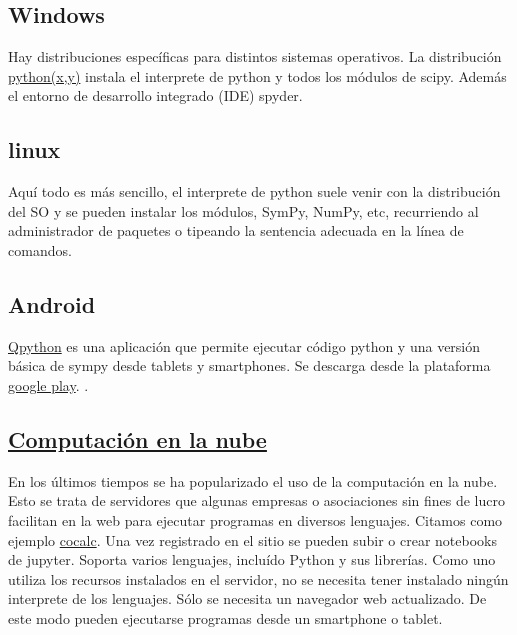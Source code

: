 \subsection{Windows} Hay distribuciones específicas para distintos sistemas operativos. La distribución  \href{https://code.google.com/p/pythonxy/}{python(x,y)}  instala el interprete de python y todos los módulos de scipy. Además el entorno de desarrollo integrado (IDE) spyder.


\subsection{linux} Aquí todo es más sencillo, el interprete de python suele venir con 
la distribución del SO y se pueden instalar los módulos, SymPy, NumPy, etc, 
recurriendo al administrador de paquetes o tipeando la sentencia adecuada en la línea 
de comandos.  

\subsection{Android} \href{http://qpython.com/}{Qpython} es una aplicación que permite ejecutar código python y una versión básica de sympy desde tablets y smartphones. Se descarga desde la plataforma \href{https://play.google.com/store/apps/details?id=com.hipipal.qpyplus}{google play}.
. 

\subsection{\href{https://es.wikipedia.org/wiki/Computación_en_la_nube}{Computación en la nube}}

En los últimos tiempos se ha popularizado el uso de la computación en la nube. Esto se trata de servidores que algunas empresas o asociaciones sin fines de lucro facilitan en la web para ejecutar programas en diversos lenguajes. Citamos como ejemplo \href{http://www.cocalc.com}{cocalc}. Una vez registrado en el sitio se pueden subir o crear notebooks de jupyter. Soporta varios lenguajes, incluído Python y sus librerías.  Como uno utiliza los recursos instalados en el servidor, no se necesita tener instalado ningún interprete de los lenguajes. Sólo se necesita un navegador web actualizado. De este modo pueden ejecutarse programas desde un smartphone o tablet. 



